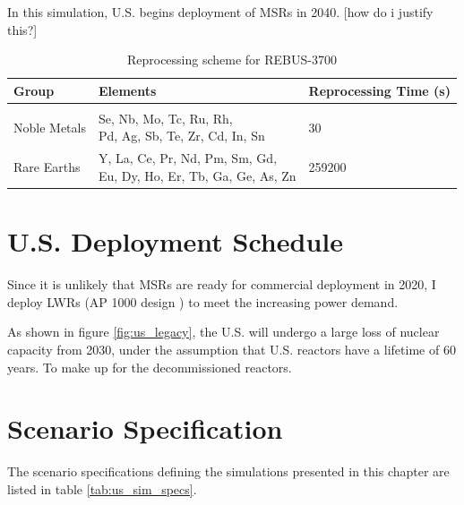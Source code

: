 In this simulation, U.S. begins deployment of \glspl{MSR}
in 2040. [how do i justify this?]


\begin{table}[h]
	\centering
	\caption{Reprocessing scheme for REBUS-3700}
	\label{tab:rebus_reproc}
	\begin{tabular}{lll}
		\hline
		Group & Elements & Reprocessing Time (s) \\
		\hline    \\
		Noble Metals & \shortstack{Se, Nb, Mo, Tc, Ru, Rh,\\ Pd, Ag, Sb, Te, Zr, Cd, In, Sn} & 30 \\
		Rare Earths & \shortstack{Y, La, Ce, Pr, Nd, Pm, Sm, Gd, \\ Eu, Dy, Ho, Er, Tb, Ga, Ge, As, Zn} & 259200 \\
		\hline
	\end{tabular}
\end{table}



\section{U.S. Deployment Schedule}



Since it is unlikely that \glspl{MSR} are ready for
commercial deployment in 2020, I deploy \glspl{LWR} (AP 1000 design \cite{sutharshan_ap1000tm_2011})
to meet the increasing power demand.

As shown in figure \ref{fig:us_legacy}, the U.S. will
undergo a large loss of nuclear capacity from 2030, under the
assumption that U.S. reactors have a lifetime of 60 years.
To make up for the decommissioned reactors.


\section{Scenario Specification}

The scenario specifications defining the simulations presented in this chapter
are listed in table \ref{tab:us_sim_specs}.

